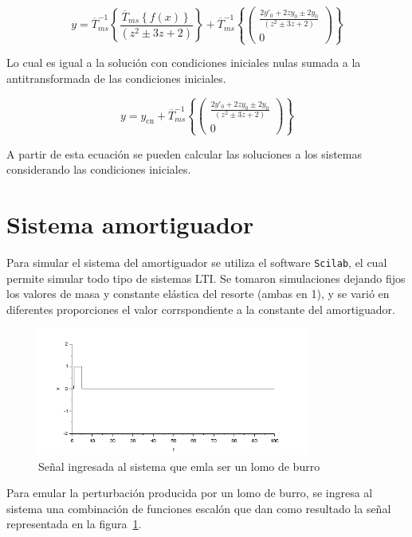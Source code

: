 \documentclass[12pt]{article}
\begin{document}
$$
y = \overline{T}_{ms}^{-1}\left\{\frac{\overline{T}_{ms}\left\{f(x)\right\} }{(z^2 \pm 3z +2)}\right\}
+\overline{T}_{ms}^{-1}\left\{\begin{pmatrix}
\frac{2y'_0 + 2z y_0 \pm 2y_0}{(z^2 \pm 3z +2)} \\[0.3 cm]
0
\end{pmatrix}\right\}
$$

Lo cual es igual a la solución con condiciones iniciales nulas sumada a la antitransformada de las condiciones iniciales.

$$
y = y_{\textrm{cn}}
+\overline{T}_{ms}^{-1}\left\{\begin{pmatrix}
\frac{2y'_0 + 2z y_0 \pm 2y_0}{(z^2 \pm 3z +2)} \\[0.3 cm]
0
\end{pmatrix}\right\}
$$

A partir de esta ecuación se pueden calcular las soluciones a los sistemas considerando las condiciones iniciales.


\section{Sistema amortiguador}

Para simular el sistema del amortiguador se utiliza el software \texttt{Scilab}, el cual permite simular todo tipo de sistemas LTI.
Se tomaron simulaciones dejando fijos los valores de masa y constante elástica del resorte (ambas en 1), y se varió en diferentes proporciones el valor corrspondiente a la constante del amortiguador.

\begin{figure}[h!]
\center
\includegraphics[width=0.8\textwidth]{amortiguador_entrada.PNG}
\caption{Señal ingresada al sistema que emla ser un lomo de burro}
\label{entrada}
\end{figure}

Para emular la perturbación producida por un lomo de burro, se ingresa al sistema una combinación de funciones escalón que dan como resultado la señal representada en la \mbox{figura \ref{entrada}}.\\
\end{document}
